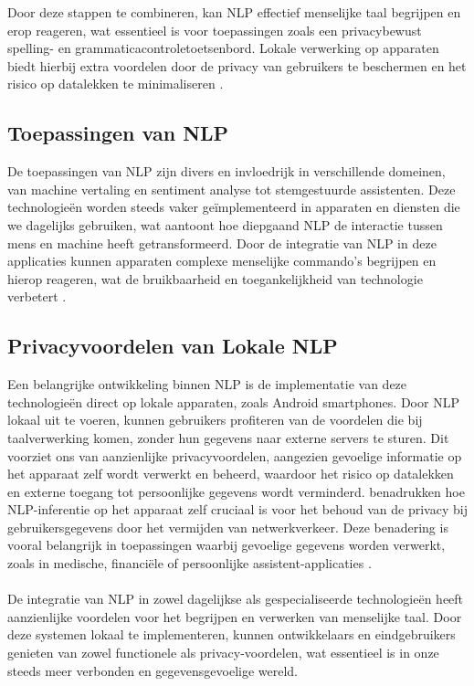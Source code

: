 Door deze stappen te combineren, kan NLP effectief menselijke taal begrijpen en erop reageren, wat essentieel is voor toepassingen zoals een privacybewust spelling- en grammaticacontroletoetsenbord. Lokale verwerking op apparaten biedt hierbij extra voordelen door de privacy van gebruikers te beschermen en het risico op datalekken te minimaliseren \autocite{Hirschberg2015}.

\subsection{Toepassingen van NLP}

De toepassingen van NLP zijn divers en invloedrijk in verschillende domeinen, van machine vertaling en sentiment analyse tot stemgestuurde assistenten. Deze technologieën worden steeds vaker geïmplementeerd in apparaten en diensten die we dagelijks gebruiken, wat aantoont hoe diepgaand NLP de interactie tussen mens en machine heeft getransformeerd. Door de integratie van NLP in deze applicaties kunnen apparaten complexe menselijke commando's begrijpen en hierop reageren, wat de bruikbaarheid en toegankelijkheid van technologie verbetert \hfill \break \autocite{Feng2020}.

\subsection{Privacyvoordelen van Lokale NLP}

Een belangrijke ontwikkeling binnen NLP is de implementatie van deze technologieën direct op lokale apparaten, zoals Android smartphones. Door NLP lokaal uit te voeren, kunnen gebruikers profiteren van de voordelen die bij taalverwerking komen, zonder hun gegevens naar externe servers te sturen. Dit voorziet ons van aanzienlijke privacyvoordelen, aangezien gevoelige informatie op het apparaat zelf wordt verwerkt en beheerd, waardoor het risico op datalekken en externe toegang tot persoonlijke gegevens wordt verminderd. \textcite{Guo2022} benadrukken hoe NLP-inferentie op het apparaat zelf cruciaal is voor het behoud van de privacy bij gebruikersgegevens door het vermijden van netwerkverkeer. Deze benadering is vooral belangrijk in toepassingen waarbij gevoelige gegevens worden verwerkt, zoals in medische, financiële of persoonlijke assistent-applicaties \autocite{Locke2021Natural}.
\\ \\
De integratie van NLP in zowel dagelijkse als gespecialiseerde technologieën heeft aanzienlijke voordelen voor het begrijpen en verwerken van menselijke taal. Door deze systemen lokaal te implementeren, kunnen ontwikkelaars en eindgebruikers genieten van zowel functionele als privacy-voordelen, wat essentieel is in onze s\-t\-ee\-ds meer verbonden en gegevensgevoelige wereld.

